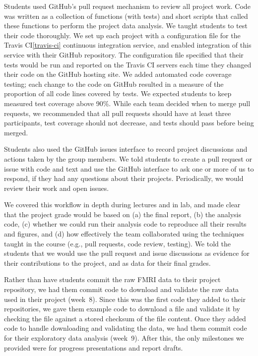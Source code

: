 Students used GitHub's pull request mechanism to review all project work.
Code was written as a collection of functions (with tests) and short
scripts that called these functions to perform the project data analysis.
We taught students to test their code thoroughly.
We set up each project with a configuration file for the Travis
CI\cref{travis-ci} continuous integration service, and enabled integration of
this service with their GitHub repository.  The configuration file specified
that their tests would be run and reported on the Travis CI servers each
time they changed their code on the GitHub hosting site.
We added automated code coverage testing; each change to the code on GitHub
resulted in a measure of the proportion of all code lines covered by tests.
We expected students to keep measured test coverage above 90\%.
While each team decided when to merge pull requests, we recommended that
all pull requests should have at least three participants, test coverage
should not decrease, and tests should pass before being merged.

Students also used the GitHub issues interface to record project discussions
and actions taken by the group members.
We told students to create a pull request
or issue with code and text and use the GitHub interface to ask one or more
of us to respond, if they had any questions about their projects.
Periodically, we would review their work and open issues.

We covered this workflow in depth during lectures and in lab,
and made clear that the project grade would be based on
(a) the final report,
(b) the analysis code,
(c) whether we could run their analysis code to reproduce all
their results and figures, and
(d) how effectively the team collaborated using the techniques
taught in the course (e.g., pull requests, code review, testing).
We told the students that we would use the pull request and issue
discussions as evidence for their contributions to the project, and as data for
their final grades.

Rather than have students commit the raw FMRI data to their project repository, we had
them commit code to download and validate
the raw data used in their project (week~8).
Since this was the first code they added to their repositories, we gave them example
code to download a file and validate it by checking the file against a stored
checksum of the file content.
Once they added code to handle downloading and validating the data,
we had them commit code for their exploratory data analysis (week~9).
After this, the only milestones we provided were for progress
presentations and report drafts.

